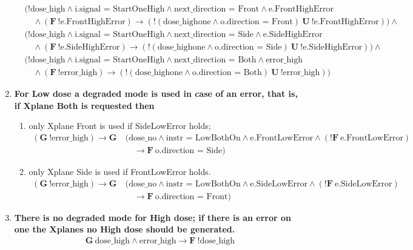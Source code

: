 \documentclass[a4paper,10pt]{article}
\newcommand{\LTLG}{\mathbf{G~}}
\newcommand{\LTLF}{\mathbf{F~}}
\newcommand{\LTLU}{\mathbf{~U~}}
\newcommand{\imply}{\rightarrow}
\newcommand{\doseno}{\textrm{dose\_no}}
\newcommand{\dosehigh}{\textrm{dose\_high}}
\newcommand{\dosehighone}{\textrm{dose\_highone}}
\newcommand{\errorhigh}{\textrm{error\_high}}
\begin{document}
\begin{enumerate}
\begin{align*}
				& (!\dosehigh \land \textrm{i.signal = StartOneHigh} \land \textrm{next\_direction = Front} \land \textrm{e.FrontHighError} \\
				&\hspace{1em}	\land (\LTLF !\textrm{e.FrontHighError}) \imply (!(\dosehighone \land \textrm{o.direction = Front}) \LTLU !\textrm{e.FrontHighError})) \land \\
				& (!\dosehigh \land \textrm{i.signal = StartOneHigh} \land \textrm{next\_direction = Side} \land \textrm{e.SideHighError} \\
				&\hspace{1em}	\land (\LTLF !\textrm{e.SideHighError}) \imply (!(\dosehighone \land \textrm{o.direction = Side}) \LTLU !\textrm{e.SideHighError})) \land \\
				& (!\dosehigh \land \textrm{i.signal = StartOneHigh} \land \textrm{next\_direction = Both} \land \errorhigh \\
				&\hspace{1em}	\land (\LTLF !\errorhigh) \imply (!(\dosehighone \land \textrm{o.direction = Both}) \LTLU !\errorhigh))
			\end{align*}
		\item \textbf{For Low dose a degraded mode is used in case of an error, that is, if Xplane Both is requested then}
			\begin{enumerate}
				\item only Xplane Front is used if SideLowError holds;
					\begin{align*}
						(\LTLG !\errorhigh) \imply \LTLG &(\doseno \land \textrm{instr = LowBothOn} \land \textrm{e.FrontLowError} \land (!\LTLF \textrm{e.FrontLowError}) \\
						&\hspace{1em}	\imply \LTLF \textrm{o.direction = Side})
					\end{align*}
				\item only Xplane Side is used if FrontLowError holds.
					\begin{align*}
						(\LTLG !\errorhigh) \imply \LTLG &(\doseno \land \textrm{instr = LowBothOn} \land \textrm{e.SideLowError} \land (!\LTLF \textrm{e.SideLowError}) \\
						&\hspace{1em}	\imply \LTLF \textrm{o.direction = Front})
					\end{align*}
			\end{enumerate}

		\item \textbf{There is no degraded mode for High dose; if there is an error on one the Xplanes no High dose should be generated.}
			\begin{align*}
				\LTLG \dosehigh \land \errorhigh \imply \LTLF !\dosehigh
			\end{align*}


\end{enumerate}
\end{document}

